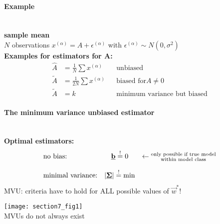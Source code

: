 \paragraph{Example}\mbox{}\\
\textbf{sample mean}\\
$N$ observations 
$
x^{(\alpha)} = A + \epsilon^{(\alpha)}
$
with $ \epsilon^{(\alpha)}\sim N(0,\sigma^2)$ \\

\textbf{Examples for estimators for A:}
\begin{align*}
\hat{A} &= \frac{1}{N} \sum x^{(\alpha)} && \text{unbiased} \\
\tilde{A} &= \frac{1}{2N} \sum x^{(\alpha)} && \text{biased for} A\neq 0 \\
\tilde{A} &= k && \text{minimum variance but biased}
\end{align*}

 

\paragraph{The minimum variance unbiased estimator}\mbox{}\\
\textbf{Optimal estimators:}
$$
	\begin{array}{lcl}
		\text{no bias:} & \vec{b} \eqexcl 0 & \leftarrow
			\substack{	\text{only possible if true model} \\
					\text{within model class} } \\\\
		\text{minimal variance:} & |\vec{\Sigma}| \eqexcl \min
			
	\end{array}
$$
MVU: criteria have to hold for ALL possible values of $\vec{w}^*$!
\vspace{5mm} 

\texttt{[image: section7\_fig1]} \\ 
MVUs do not always exist \\

